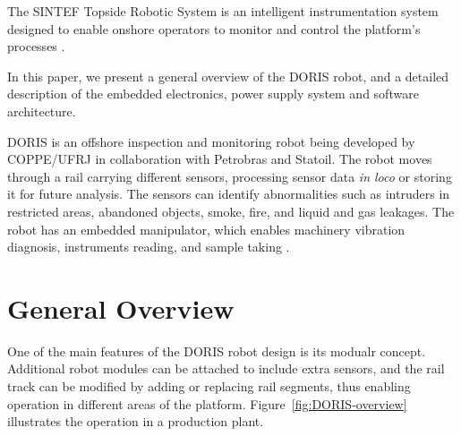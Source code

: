 \documentclass{ifacconf}
\begin{document}

The SINTEF Topside Robotic System is an intelligent instrumentation system
designed to enable onshore operators to monitor and control the platform's
processes \citep{kyrkjebo2009robotic}.

In this paper, we present a general overview of the DORIS robot, and a detailed
description of the embedded electronics, power supply system and software architecture.

DORIS is an offshore inspection and monitoring robot being developed by
COPPE/UFRJ in collaboration with Petrobras and Statoil. The robot moves through
a rail carrying different sensors, processing sensor data \emph{in loco} or
storing it for future analysis. The sensors can identify abnormalities
such as intruders in restricted areas, abandoned objects, smoke, fire, and
liquid and gas leakages. The robot has an embedded manipulator, which enables
machinery vibration diagnosis, instruments reading, and sample taking
\citep{cba}.


\section{General Overview}\label{sec:general_overview}

One of the main features of the DORIS robot design is its modualr concept.
Additional robot modules can be attached to include extra sensors, and the rail
track can be modified by adding or replacing rail segments, thus enabling
operation in different areas of the platform. Figure~\ref{fig:DORIS-overview}
illustrates the operation in a production plant.
\end{document}

